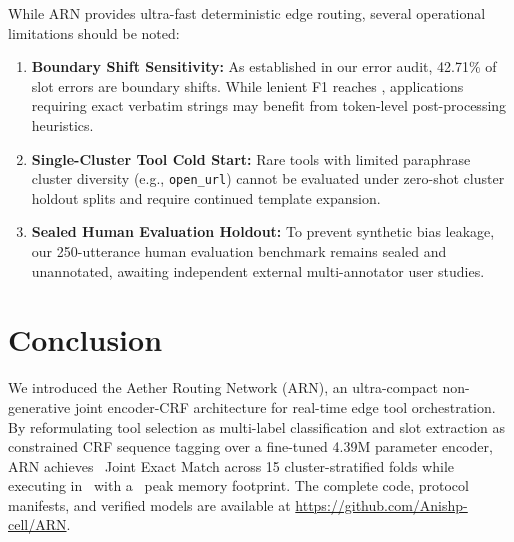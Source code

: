 \documentclass[letterpaper]{article}
\begin{document}
While ARN provides ultra-fast deterministic edge routing, several operational limitations should be noted:
\begin{enumerate}
    \item \textbf{Boundary Shift Sensitivity:} As established in our error audit, 42.71\% of slot errors are boundary shifts. While lenient F1 reaches \PrimaryLenientFOne, applications requiring exact verbatim strings may benefit from token-level post-processing heuristics.
    \item \textbf{Single-Cluster Tool Cold Start:} Rare tools with limited paraphrase cluster diversity (e.g., \texttt{open\_url}) cannot be evaluated under zero-shot cluster holdout splits and require continued template expansion.
    \item \textbf{Sealed Human Evaluation Holdout:} To prevent synthetic bias leakage, our 250-utterance human evaluation benchmark remains sealed and unannotated, awaiting independent external multi-annotator user studies.
\end{enumerate}

\section{Conclusion}

We introduced the Aether Routing Network (ARN), an ultra-compact non-generative joint encoder-CRF architecture for real-time edge tool orchestration. By reformulating tool selection as multi-label classification and slot extraction as constrained CRF sequence tagging over a fine-tuned 4.39M parameter encoder, ARN achieves \PrimaryJointEM\ Joint Exact Match across 15 cluster-stratified folds while executing in \ONNXINTFourTLatencyMean\ with a \IsolatedPeakRSS\ peak memory footprint. The complete code, protocol manifests, and verified models are available at \url{https://github.com/Anishp-cell/ARN}.


\end{document}
